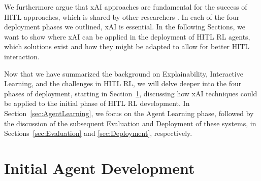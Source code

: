 \documentclass[twoside,11pt]{article}
\begin{document}
We furthermore argue that xAI approaches are fundamental for the success of HITL approaches, which is shared by other researchers \citep{heuillet2021explainability,milani2022survey}. In each of the four deployment phases we outlined, xAI is essential. In the following Sections, we want to show where xAI can be applied in the deployment of HITL RL agents, which solutions exist and how they might be adapted to allow for better HITL interaction.

Now that we have summarized the background on Explainability, Interactive Learning, and the challenges in HITL RL, we will delve deeper into the four phases of deployment, starting in Section~\ref{sec:Developing}, discussing how xAI techniques could be applied to the initial phase of HITL RL development. In Section~\ref{sec:AgentLearning}, we focus on the Agent Learning phase, followed by the discussion of the subsequent Evaluation and Deployment of these systems, in Sections~\ref{sec:Evaluation} and \ref{sec:Deployment}, respectively.


\section{Initial Agent Development}
\label{sec:Developing}
\end{document}
